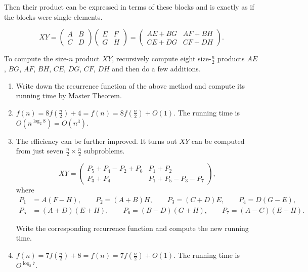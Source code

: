 \documentclass[12pt,a4paper]{article}
\makeatletter
\newtheorem*{solution}{Solution}
\theoremstyle{definition}
\renewenvironment{solution}[1][Solution] {\par\pushQED{\qed}\normalfont\topsep6\p@\@plus6\p@\relax\trivlist\item[\hskip\labelsep\bfseries#1\@addpunct{.}]\ignorespaces}{\popQED\endtrivlist\@endpefalse} \makeatother
\makeatother
\begin{document}
\begin{enumerate}
Then their product can be expressed in terms of these blocks and is exactly as if the blocks were single elements.

 \begin{displaymath}
 XY=
\left(\begin{array}{c|c}
A & B \\
\hline
C & D \end{array}\right)
\left(\begin{array}{c|c}
E & F \\
\hline
G & H \end{array}\right)
=
\left(\begin{array}{c|c}
AE+BG & AF+BH \\
\hline
CE+DG & CF+DH \end{array}\right).
 \end{displaymath}

To compute the size-$n$ product $XY$, recursively compute eight size-$\frac{n}{2}$ products $AE$,  $BG$, $AF$, $BH$, $CE$, $DG$, $CF$, $DH$ and then do a few additions.

\begin{enumerate}
\item Write down the recurrence function of the above method and compute its running time by Master Theorem.

\begin{solution}
	$f(n) = 8f(\frac{n}{2})+4=f(n) = 8f(\frac{n}{2})+O(1)$. The running time is $O(n^{\log_{2}{8}})=O(n^3)$.
\end{solution}

\item The efficiency can be further improved. It turns out $XY$ can be computed from just seven $\frac{n}{2}\times \frac{n}{2}$ subproblems.

\begin{displaymath}
 XY=
\left(\begin{array}{c|c}
P_{5}+P_{4}-P_{2}+P_{6} & P_{1}+P_{2} \\
\hline
P_{3}+P_{4} & P_{1}+P_{5}-P_{3}-P_{7} \end{array}\right),
\end{displaymath}
where
\begin{align*}
P_{1}&=A(F-H), \qquad P_{2}=(A+B)H, \qquad P_{3}=(C+D)E, \qquad P_{4}=D(G-E),\\
P_{5}&=(A+D)(E+H),\qquad P_{6}=(B-D)(G+H),\qquad P_{7}=(A-C)(E+H).
\end{align*}

Write the corresponding recurrence function and compute the new running time.
\begin{solution}
	$f(n) = 7f(\frac{n}{2})+8=f(n) = 7f(\frac{n}{2})+O(1)$. The running time is $O^{\log_{2}{7}}$.
\end{solution}

\end{enumerate}


\end{enumerate}

\end{document}

